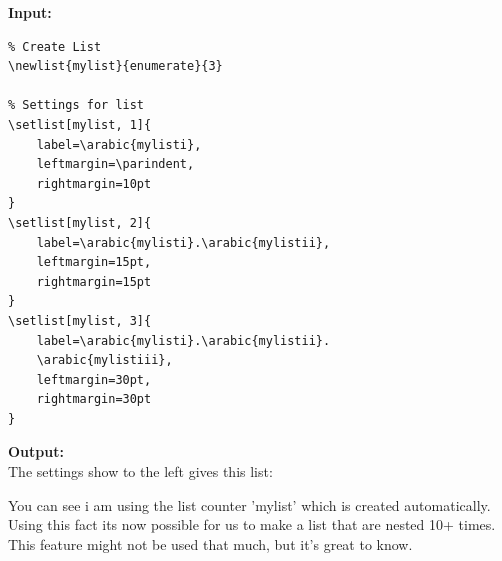 \begin{multicols}{2}
\textbf{Input:} \\
\begin{verbatim}
% Create List
\newlist{mylist}{enumerate}{3}

% Settings for list
\setlist[mylist, 1]{
    label=\arabic{mylisti},
    leftmargin=\parindent,
    rightmargin=10pt
}
\setlist[mylist, 2]{
    label=\arabic{mylisti}.\arabic{mylistii},
    leftmargin=15pt,
    rightmargin=15pt
}
\setlist[mylist, 3]{
    label=\arabic{mylisti}.\arabic{mylistii}.
    \arabic{mylistiii},
    leftmargin=30pt,
    rightmargin=30pt
}
\end{verbatim}
 \newcolumn

    \begin{minipage}{\linewidth}
        \textbf{Output:} \\
        The settings show to the left gives this list:

        \begin{mylist}
        \item \randomtext
        \begin{mylist}
            \item \randomtext
            \begin{mylist}
                \item \randomtext
            \end{mylist}
        \end{mylist}
        \end{mylist}
    \end{minipage}
\end{multicols} %

You can see i am using the list counter 'mylist' which is created automatically. Using this fact its now possible for us to make a list that are nested 10+ times. This feature might not be used that much, but it's great to know.
